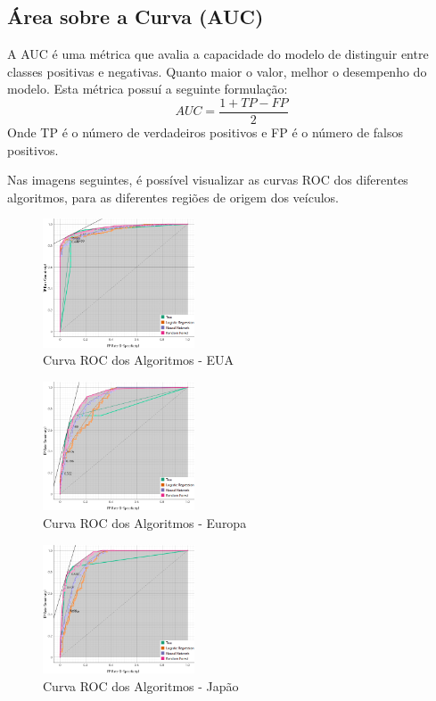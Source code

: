 \documentclass[conference]{IEEEtran}
\begin{document}
\subsection{Área sobre a Curva (AUC)}
A AUC é uma métrica que avalia a capacidade do modelo de distinguir entre classes positivas e negativas. Quanto maior o valor, melhor o desempenho do modelo.
Esta métrica possuí a seguinte formulação:
\begin{equation}
	AUC = \frac{1 + TP - FP}{2}
\end{equation}
Onde TP é o número de verdadeiros positivos e FP é o número de falsos positivos.

Nas imagens seguintes, é possível visualizar as curvas ROC dos diferentes algoritmos, para as diferentes regiões de origem dos veículos.

\begin{figure}[!ht]
	\centering
	\includegraphics[width=0.4\textwidth]{Resources/ROC_EUA.png}
	\caption{Curva ROC dos Algoritmos - EUA}
\end{figure}

\begin{figure}[!ht]
	\centering
	\includegraphics[width=0.4\textwidth]{Resources/ROC_EU.png}
	\caption{Curva ROC dos Algoritmos - Europa}
\end{figure}

\begin{figure}[!ht]
	\centering
	\includegraphics[width=0.4\textwidth]{Resources/ROC_JP.png}
	\caption{Curva ROC dos Algoritmos - Japão}
\end{figure}
\end{document}
